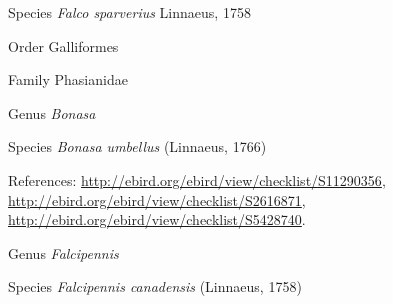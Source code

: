 \documentclass[9pt, article]{memoir}
\begin{document}
\begin{multicols}{2}
\vspace{6pt}\noindent\hspace{36pt}Species \textit{Falco sparverius} Linnaeus, 1758


\vspace{6pt}\noindent\hspace{18pt}Order Galliformes


\vspace{6pt}\noindent\hspace{24pt}Family Phasianidae


\vspace{6pt}\noindent\hspace{30pt}Genus \textit{Bonasa}


\vspace{6pt}\noindent\hspace{36pt}Species \textit{Bonasa umbellus} (Linnaeus, 1766)


\vspace{6pt}References: 
\url{http://ebird.org/ebird/view/checklist/S11290356}, 
\url{http://ebird.org/ebird/view/checklist/S2616871}, 
\url{http://ebird.org/ebird/view/checklist/S5428740}.

\vspace{6pt}\noindent\hspace{30pt}Genus \textit{Falcipennis}


\vspace{6pt}\noindent\hspace{36pt}Species \textit{Falcipennis canadensis} (Linnaeus, 1758)



\end{multicols}
\end{document}
